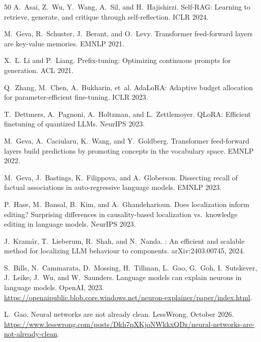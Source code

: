 \documentclass[11pt]{article}
\begin{document}
\begin{thebibliography}{50}
A.~Asai, Z.~Wu, Y.~Wang, A.~Sil, and H.~Hajishirzi.
\newblock Self-RAG: Learning to retrieve, generate, and critique through self-reflection.
\newblock ICLR 2024.

M.~Geva, R.~Schuster, J.~Berant, and O.~Levy.
\newblock Transformer feed-forward layers are key-value memories.
\newblock EMNLP 2021.

X.~L. Li and P.~Liang.
\newblock Prefix-tuning: Optimizing continuous prompts for generation.
\newblock ACL 2021.

Q.~Zhang, M.~Chen, A.~Bukharin, et~al.
\newblock AdaLoRA: Adaptive budget allocation for parameter-efficient fine-tuning.
\newblock ICLR 2023.

T.~Dettmers, A.~Pagnoni, A.~Holtzman, and L.~Zettlemoyer.
\newblock QLoRA: Efficient finetuning of quantized LLMs.
\newblock NeurIPS 2023.


M.~Geva, A.~Caciularu, K.~Wang, and Y.~Goldberg.
\newblock Transformer feed-forward layers build predictions by promoting
  concepts in the vocabulary space.
\newblock EMNLP 2022.

M.~Geva, J.~Bastings, K.~Filippova, and A.~Globerson.
\newblock Dissecting recall of factual associations in auto-regressive
  language models.
\newblock EMNLP 2023.

P.~Hase, M.~Bansal, B.~Kim, and A.~Ghandeharioun.
\newblock Does localization inform editing? {S}urprising differences in
  causality-based localization vs.\ knowledge editing in language models.
\newblock NeurIPS 2023.

J.~Kram{\'a}r, T.~Lieberum, R.~Shah, and N.~Nanda.
: An efficient and scalable method for localizing {LLM}
  behaviour to components.
\newblock arXiv:2403.00745, 2024.

S.~Bills, N.~Cammarata, D.~Mossing, H.~Tillman, L.~Gao, G.~Goh,
  I.~Sutskever, J.~Leike, J.~Wu, and W.~Saunders.
\newblock Language models can explain neurons in language models.
\newblock OpenAI, 2023.
\newblock
  \url{https://openaipublic.blob.core.windows.net/neuron-explainer/paper/index.html}.

L.~Gao.
\newblock Neural networks are not already clean.
\newblock LessWrong, October 2026.
\newblock
  \url{https://www.lesswrong.com/posts/Dkh7pXKjoNWkkxQDz/neural-networks-are-not-already-clean}.

\end{thebibliography}
\end{document}

